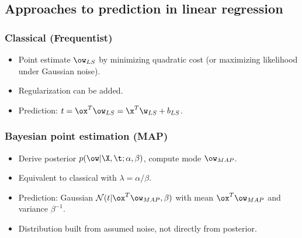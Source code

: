 \subsection*{Approaches to prediction in linear regression}

\subsubsection*{Classical (Frequentist)}
\begin{itemize}
    \item Point estimate $\ow_{LS}$ by minimizing quadratic cost (or maximizing likelihood under Gaussian noise).
    \item Regularization can be added.
    \item Prediction: $t=\ox^T\ow_{LS}=\x^T\w_{LS}+b_{LS}$.
\end{itemize}

\subsubsection*{Bayesian point estimation (MAP)}
\begin{itemize}
    \item Derive posterior $p(\ow|\X,\t; \alpha,\beta)$, compute mode $\ow_{MAP}$.
    \item Equivalent to classical with $\lambda=\alpha/\beta$.
    \item Prediction: Gaussian $\mathcal{N}(t|\ox^T\ow_{MAP}, \beta)$ with mean $\ox^{T}\ow_{MAP}$ and variance $\beta^{-1}$.
    \item Distribution built from assumed noise, not directly from posterior.
\end{itemize}

